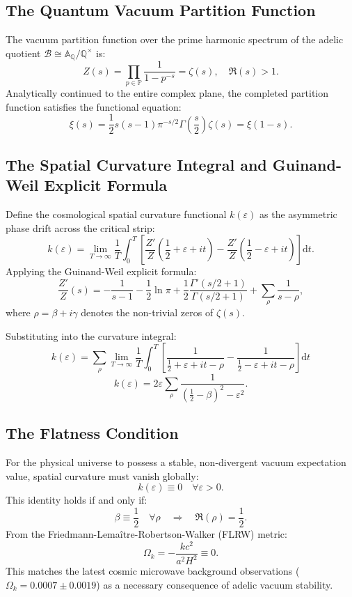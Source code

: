 \documentclass[11pt, a4paper, twocolumn]{article}
\theoremstyle{plain}
\theoremstyle{definition}
\begin{document}
\subsection{The Quantum Vacuum Partition Function}
The vacuum partition function over the prime harmonic spectrum of the adelic quotient $\mathcal{B} \cong \mathbb{A}_\mathbb{Q} / \mathbb{Q}^\times$ is:
\[
Z(s) = \prod_{p \in \mathbb{P}} \frac{1}{1 - p^{-s}} = \zeta(s), \quad \Re(s) > 1.
\]
Analytically continued to the entire complex plane, the completed partition function satisfies the functional equation:
\[
\xi(s) = \frac{1}{2} s(s-1) \pi^{-s/2} \Gamma\left(\frac{s}{2}\right) \zeta(s) = \xi(1-s).
\]

\subsection{The Spatial Curvature Integral and Guinand-Weil Explicit Formula}
Define the cosmological spatial curvature functional $k(\varepsilon)$ as the asymmetric phase drift across the critical strip:
\[
k(\varepsilon) = \lim_{T \to \infty} \frac{1}{T} \int_0^T \left[ \frac{Z'}{Z}\left(\frac{1}{2} + \varepsilon + i t\right) - \frac{Z'}{Z}\left(\frac{1}{2} - \varepsilon + i t\right) \right] \mathrm{d}t.
\]
Applying the Guinand-Weil explicit formula:
\[
\frac{Z'}{Z}(s) = -\frac{1}{s-1} - \frac{1}{2}\ln \pi + \frac{1}{2}\frac{\Gamma'(s/2+1)}{\Gamma(s/2+1)} + \sum_{\rho} \frac{1}{s - \rho},
\]
where $\rho = \beta + i\gamma$ denotes the non-trivial zeros of $\zeta(s)$.

Substituting into the curvature integral:
\[
k(\varepsilon) = \sum_{\rho} \lim_{T \to \infty} \frac{1}{T} \int_0^T \left[ \frac{1}{\frac{1}{2} + \varepsilon + i t - \rho} - \frac{1}{\frac{1}{2} - \varepsilon + i t - \rho} \right] \mathrm{d}t
\]
\[
k(\varepsilon) = 2\varepsilon \sum_{\rho} \frac{1}{\left(\frac{1}{2} - \beta\right)^2 - \varepsilon^2}.
\]

\subsection{The Flatness Condition}
For the physical universe to possess a stable, non-divergent vacuum expectation value, spatial curvature must vanish globally:
\[
k(\varepsilon) \equiv 0 \quad \forall \varepsilon > 0.
\]
This identity holds if and only if:
\[
\beta \equiv \frac{1}{2} \quad \forall \rho \quad\Longrightarrow\quad \Re(\rho) = \frac{1}{2}.
\]
From the Friedmann-Lemaître-Robertson-Walker (FLRW) metric:
\[
\Omega_k = -\frac{k c^2}{a^2 H^2} \equiv 0.
\]
This matches the latest cosmic microwave background observations ($\Omega_k = 0.0007 \pm 0.0019$) as a necessary consequence of adelic vacuum stability.
\end{document}
